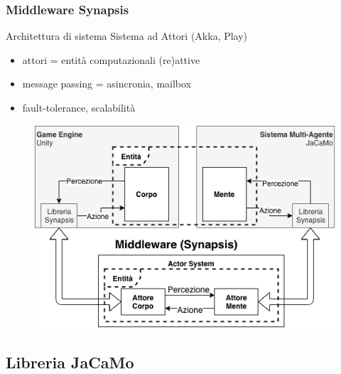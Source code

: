 \documentclass[handout]{beamer}\mode<presentation>{\usetheme{AMSCesenaBleu}}
\begin{document}
\begin{frame}
\frametitle[Synapsis, Liberie JaCaMo e Unity]{Middleware Synapsis}

\begin{block}{Architettura di sistema}
{\small Sistema ad Attori (Akka, Play)}
{\footnotesize \begin{itemize}
    \item attori = entità computazionali (re)attive
    \item message passing = asincronia, mailbox
    \item fault-tolerance, scalabilità
\end{itemize}}

\end{block}

\begin{figure}
    \includegraphics[width=0.5\linewidth]{figures/Middleware_associazione_entita.png}
\end{figure}

\end{frame}

\subsection{Libreria JaCaMo}
\end{document}
